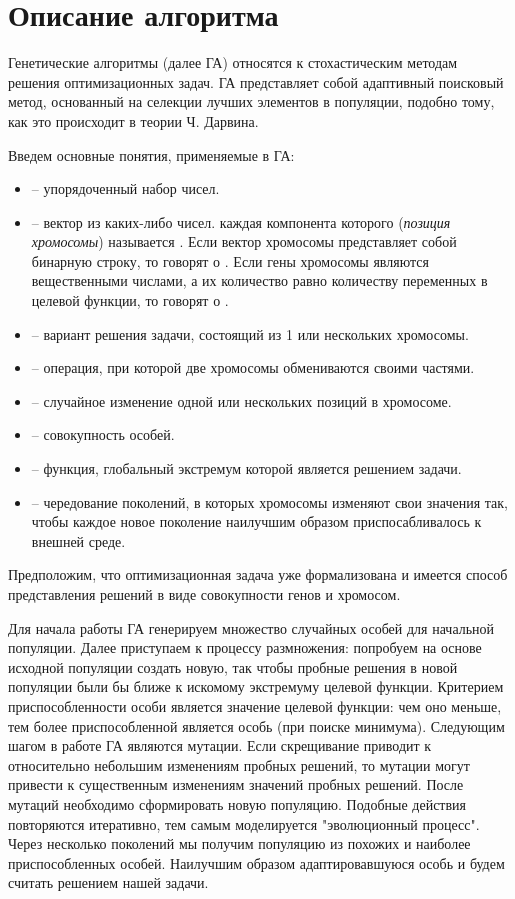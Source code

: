 \section{Описание алгоритма}
Генетические алгоритмы (далее ГА) относятся к стохастическим методам решения оптимизационных задач. ГА представляет собой адаптивный поисковый метод, основанный на селекции лучших элементов в популяции, подобно тому, как это происходит в теории Ч. Дарвина.

Введем основные понятия, применяемые в ГА:
\begin{itemize}
	\item {} -- упорядоченный набор чисел.
	\item {} -- вектор из каких-либо чисел. каждая компонента которого (\textit{позиция хромосомы}) называется . Если вектор хромосомы представляет собой бинарную строку, то говорят о . Если гены хромосомы являются вещественными числами, а их количество равно количеству переменных в целевой функции, то говорят о . \cite{mathGA}
	\item {} -- вариант решения задачи, состоящий из 1 или нескольких хромосомы.
	\item {} -- операция, при которой две хромосомы обмениваются своими частями.
	\item {} -- случайное изменение одной или нескольких позиций в хромосоме.
	\item {} -- совокупность особей.
	\item {} -- функция, глобальный экстремум которой является решением задачи.
	\item {} -- чередование поколений, в которых хромосомы изменяют свои значения так, чтобы каждое новое поколение наилучшим образом приспосабливалось к внешней среде.
\end{itemize}

Предположим, что оптимизационная задача уже формализована и имеется способ представления решений в виде совокупности генов и хромосом.

Для начала работы ГА генерируем множество случайных особей для начальной популяции. Далее приступаем к процессу размножения: попробуем на основе исходной популяции создать новую, так чтобы пробные решения в новой популяции были бы ближе к искомому экстремуму целевой функции. Критерием приспособленности особи является значение целевой функции: чем оно меньше, тем более приспособленной является особь (при поиске минимума). Следующим шагом в работе ГА являются мутации. Если скрещивание приводит к относительно небольшим изменениям пробных решений, то мутации могут привести к существенным изменениям значений пробных решений. После мутаций необходимо сформировать новую популяцию. Подобные действия повторяются итеративно, тем самым моделируется "эволюционный процесс". Через несколько поколений мы получим популяцию из похожих и наиболее приспособленных особей. Наилучшим образом адаптировавшуюся особь и будем считать решением нашей задачи.

